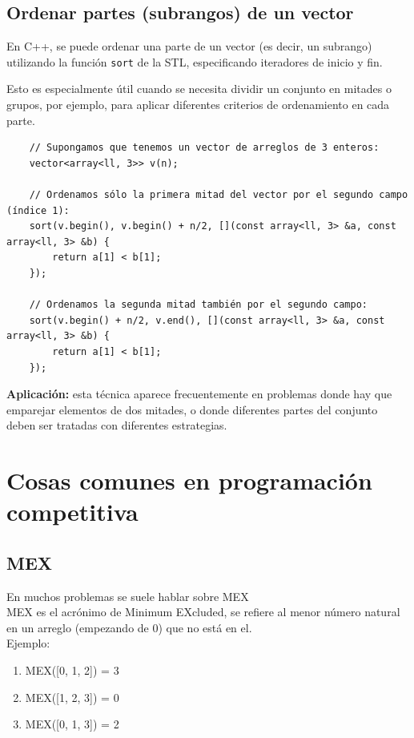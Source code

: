 \subsection*{Ordenar partes (subrangos) de un vector}

En C++, se puede ordenar una parte de un vector (es decir, un subrango) utilizando la función \texttt{sort} de la STL, especificando iteradores de inicio y fin.

Esto es especialmente útil cuando se necesita dividir un conjunto en mitades o grupos, por ejemplo, para aplicar diferentes criterios de ordenamiento en cada parte.

\begin{verbatim}
	// Supongamos que tenemos un vector de arreglos de 3 enteros:
	vector<array<ll, 3>> v(n);
	
	// Ordenamos sólo la primera mitad del vector por el segundo campo (índice 1):
	sort(v.begin(), v.begin() + n/2, [](const array<ll, 3> &a, const array<ll, 3> &b) {
		return a[1] < b[1];
	});
	
	// Ordenamos la segunda mitad también por el segundo campo:
	sort(v.begin() + n/2, v.end(), [](const array<ll, 3> &a, const array<ll, 3> &b) {
		return a[1] < b[1];
	});
\end{verbatim}

\textbf{Aplicación:} esta técnica aparece frecuentemente en problemas donde hay que emparejar elementos de dos mitades, o donde diferentes partes del conjunto deben ser tratadas con diferentes estrategias.

\section{Cosas comunes en programación competitiva}
\subsection{MEX}
En muchos problemas se suele hablar sobre MEX \\
MEX es el acrónimo de Minimum EXcluded, se refiere al menor número natural en un arreglo (empezando de 0) que no está en el. \\
Ejemplo: 

\begin{enumerate}
	\item MEX([0, 1, 2]) = 3
	\item  MEX([1, 2, 3]) = 0
	\item  MEX([0, 1, 3]) = 2
\end{enumerate}

